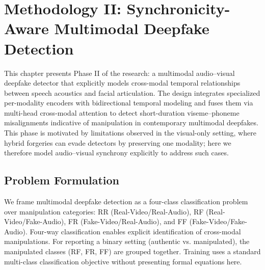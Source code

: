 \chapter{Methodology II: Synchronicity-Aware Multimodal Deepfake Detection}
\label{ch:method-multimodal}

This chapter presents Phase II of the research: a multimodal audio–visual deepfake detector that explicitly models cross-modal temporal relationships between speech acoustics and facial articulation. The design integrates specialized per-modality encoders with bidirectional temporal modeling and fuses them via multi-head cross-modal attention to detect short-duration viseme–phoneme misalignments indicative of manipulation in contemporary multimodal deepfakes. This phase is motivated by limitations observed in the visual-only setting, where hybrid forgeries can evade detectors by preserving one modality; here we therefore model audio–visual synchrony explicitly to address such cases.

\section{Problem Formulation}
We frame multimodal deepfake detection as a four-class classification problem over manipulation categories: RR (Real-Video/Real-Audio), RF (Real-Video/Fake-Audio), FR (Fake-Video/Real-Audio), and FF (Fake-Video/Fake-Audio). Four-way classification enables explicit identification of cross-modal manipulations. For reporting a binary setting (authentic vs. manipulated), the manipulated classes (RF, FR, FF) are grouped together. Training uses a standard multi-class classification objective without presenting formal equations here.

